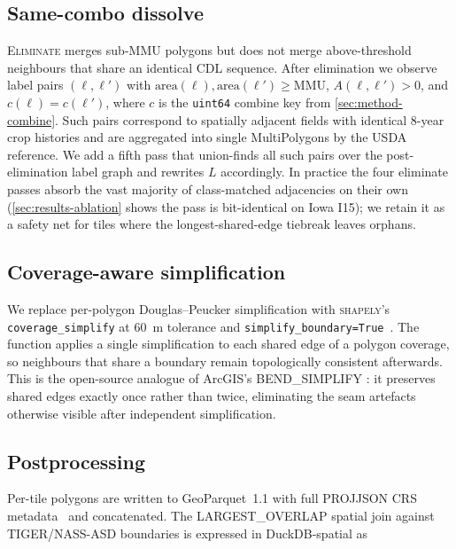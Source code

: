 \documentclass{article}
\begin{document}
\subsection{Same-combo dissolve}
\label{sec:method-dissolve}

\textsc{Eliminate} merges sub-MMU polygons but does not merge
above-threshold neighbours that share an identical CDL sequence. After
elimination we observe label pairs $(\ell, \ell')$ with
$\text{area}(\ell), \text{area}(\ell') \geq \text{MMU}$,
$A(\ell, \ell') > 0$, and $c(\ell) = c(\ell')$, where $c$ is the
\texttt{uint64} combine key from \cref{sec:method-combine}. Such pairs
correspond to spatially adjacent fields with identical 8-year crop
histories and are aggregated into single MultiPolygons by the USDA
reference. We add a fifth pass that union-finds all such pairs over
the post-elimination label graph and rewrites $L$ accordingly. In
practice the four eliminate passes absorb the vast majority of
class-matched adjacencies on their own (\cref{sec:results-ablation}
shows the pass is bit-identical on Iowa I15); we retain it as a safety
net for tiles where the longest-shared-edge tiebreak leaves orphans.

\subsection{Coverage-aware simplification}
\label{sec:method-simplify}

We replace per-polygon Douglas--Peucker simplification with
\textsc{shapely}'s \texttt{coverage\_simplify} at 60~m tolerance and
\texttt{simplify\_boundary=True}~\citep{shapely}. The function applies a
single simplification to each shared edge of a polygon coverage, so
neighbours that share a boundary remain topologically consistent
afterwards. This is the open-source analogue of ArcGIS's
\textsc{BEND\_SIMPLIFY} \citep{wang1998bend}: it preserves shared edges
exactly once rather than twice, eliminating the seam artefacts
otherwise visible after independent simplification.

\subsection{Postprocessing}
\label{sec:method-postprocess}

Per-tile polygons are written to GeoParquet~1.1 with full PROJJSON CRS
metadata~\citep{geoparquet,kelsey2023geoparquet} and concatenated. The
\textsc{LARGEST\_OVERLAP} spatial join against TIGER/NASS-ASD
boundaries is expressed in DuckDB-spatial as
\end{document}
